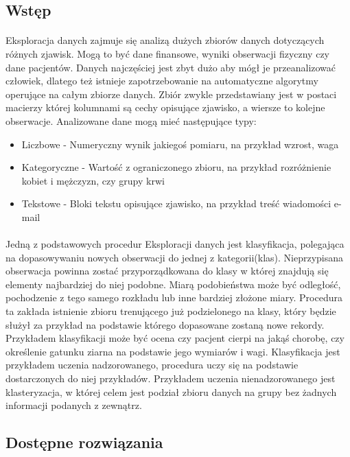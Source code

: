 \documentclass[a4paper,12pt,twoside]{article}
\begin{document}
\subsection{Wstęp}
\paragraph{}
Eksploracja danych zajmuje się analizą dużych zbiorów danych dotyczących różnych zjawisk. Mogą to być dane finansowe, wyniki obserwacji fizyczny czy dane pacjentów. Danych najczęściej jest zbyt dużo aby mógł je przeanalizować człowiek, dlatego też istnieje zapotrzebowanie na automatyczne algorytmy operujące na całym zbiorze danych. Zbiór zwykle przedstawiany jest w postaci macierzy której kolumnami są cechy opisujące zjawisko, a wiersze to kolejne obserwacje. Analizowane dane mogą mieć następujące typy:
\begin{itemize}
    \item Liczbowe - Numeryczny wynik jakiegoś pomiaru, na przykład wzrost, waga
    \item Kategoryczne - Wartość z ograniczonego zbioru, na przykład rozróżnienie kobiet i mężczyzn, czy grupy krwi
    \item Tekstowe - Bloki tekstu opisujące zjawisko, na przykład treść wiadomości e-mail 
\end{itemize}
\paragraph{}
Jedną z podstawowych procedur Eksploracji danych jest klasyfikacja, polegająca na dopasowywaniu nowych obserwacji do jednej z kategorii(klas). Nieprzypisana obserwacja powinna zostać przyporządkowana do klasy w której znajdują się  elementy najbardziej do niej podobne. Miarą podobieństwa może być odległość, pochodzenie z tego samego rozkładu lub inne bardziej złożone miary. Procedura ta zakłada istnienie zbioru trenującego już podzielonego na klasy, który będzie służył za przykład na podstawie którego dopasowane zostaną nowe rekordy.  Przykładem klasyfikacji może być  ocena czy pacjent cierpi na jakąś chorobę, czy określenie gatunku ziarna na podstawie jego wymiarów i wagi.  Klasyfikacja jest przykładem uczenia nadzorowanego, procedura uczy się na podstawie dostarczonych do niej przykładów. Przykładem uczenia nienadzorowanego jest klasteryzacja, w której celem jest podział zbioru danych na grupy bez żadnych informacji podanych z zewnątrz.
\newpage
\subsection{Dostępne rozwiązania}
\end{document}
